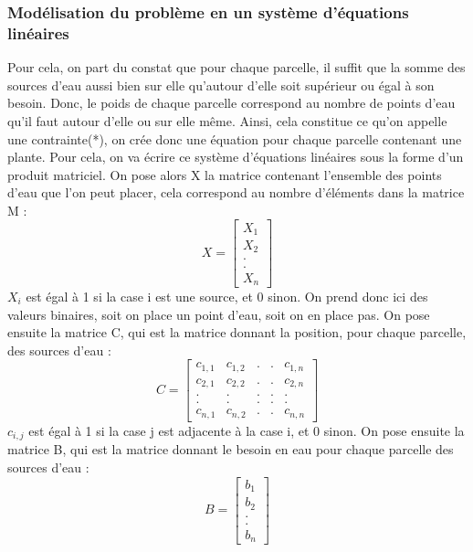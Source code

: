 \documentclass[french,a4paper]{article}
\begin{document}
\subsubsection{Modélisation du problème en un système d'équations linéaires}
Pour cela, on part du constat que pour chaque parcelle, il suffit que la somme des sources d'eau aussi bien sur elle qu'autour d'elle soit supérieur ou égal à son besoin. Donc, le poids de chaque parcelle correspond au nombre de points d'eau qu'il faut autour d'elle ou sur elle même.
Ainsi, cela constitue ce qu'on appelle une contrainte(*), on crée donc une équation pour chaque parcelle contenant une plante. Pour cela, on va écrire ce système d'équations linéaires sous la forme d'un produit matriciel.
\newline On pose alors X la matrice contenant l'ensemble des points d'eau que l'on peut placer, cela correspond au nombre d'éléments dans la matrice M :
\newline \[X = \begin{bmatrix} X_1 \\ X_2 \\ . \\ . \\ X_n \end{bmatrix}\]
\newline $X_i$ est égal à 1 si la case i est une source, et 0 sinon. On prend donc ici des valeurs binaires, soit on place un point d'eau, soit on en place pas.
\newline On pose ensuite la matrice C, qui est la matrice donnant la position, pour chaque parcelle, des sources d'eau :
\newline \[C = \begin{bmatrix} c_{1,1} & c_{1,2} & . & . & c_{1,n} \\ c_{2,1} & c_{2,2} & . & . & c_{2,n} \\ . & . & . & . & . \\ . & . & . & . & . \\ c_{n,1} & c_{n,2} & . & . & c_{n,n} \end{bmatrix}\]
\newline $c_{i,j}$ est égal à 1 si la case j est adjacente à la case i, et 0 sinon.
\newline On pose ensuite la matrice B, qui est la matrice donnant le besoin en eau pour chaque parcelle des sources d'eau :
\newline \[B = \begin{bmatrix} b_1 \\ b_2 \\ . \\ . \\ b_n \end{bmatrix}\]
\end{document}
